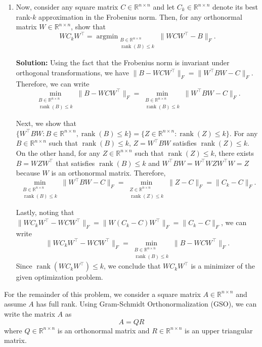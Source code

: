 \documentclass[10pt]{article}
\theoremstyle{definition}
\theoremstyle{plain}
\newcommand{\RR}{\mathbb{R}}
\DeclareMathOperator{\rank}{rank}
\DeclareMathOperator*{\argmin}{argmin}
\begin{document}
\begin{enumerate}[label=(\alph*)]
    \item Now, consider any square matrix $C \in \RR^{n \times n}$ and let $C_k \in \RR^{n \times n}$ denote its best rank-$k$ approximation in the Frobenius norm. Then, for any orthonormal matrix $W \in \RR^{n \times n}$, show that
    \[
        W C_k W^\top = \argmin_{\substack{B \in \RR^{n \times n} \\ \rank(B) \le k}} \|WCW^\top - B\|_F.
    \]

    \textbf{Solution:} Using the fact that the Frobenius norm is invariant under orthogonal transformations, we have $\|B - WCW^\top\|_F = \|W^\top BW - C\|_F$. Therefore, we can write
    \[
        \min_{\substack{B \in \RR^{n \times n} \\ \rank(B) \le k}} \|B - WCW^\top\|_F = \min_{\substack{B \in \RR^{n \times n} \\ \rank(B) \le k}} \|W^\top BW - C\|_F.
    \]

    Next, we show that $\{W^\top BW : B \in \RR^{n \times n}, \rank(B) \le k\} = \{Z \in \RR^{n \times n} : \rank(Z) \le k\}$. For any $B \in \RR^{n \times n}$ such that $\rank(B) \le k$, $Z = W^\top BW$ satisfies $\rank(Z) \le k$. On the other hand, for any $Z \in \RR^{n \times n}$ such that $\rank(Z) \le k$, there exists $B = WZW^\top$ that satisfies $\rank(B) \le k$ and $W^\top BW = W^\top WZW^\top W = Z$ because $W$ is an orthonormal matrix. Therefore,
    \[
        \min_{\substack{B \in \RR^{n \times n} \\ \rank(B) \le k}} \|W^\top BW - C\|_F = \min_{\substack{Z \in \RR^{n \times n} \\ \rank(Z) \le k}} \|Z - C\|_F = \|C_k - C\|_F.
    \]

    Lastly, noting that $\|WC_kW^\top - WCW^\top\|_F = \|W(C_k - C)W^\top\|_F = \|C_k - C\|_F$, we can write
    \[
        \|WC_kW^\top - WCW^\top\|_F = \min_{\substack{B \in \RR^{n \times n} \\ \rank(B) \le k}} \|B - WCW^\top\|_F.
    \]
    Since $\rank(WC_kW^\top) \le k$, we conclude that $WC_kW^\top$ is a minimizer of the given optimization problem.
\end{enumerate}

For the remainder of this problem, we consider a square matrix $A \in \RR^{n \times n}$ and assume $A$ has full rank. Using Gram-Schmidt Orthonormalization (GSO), we can write the matrix $A$ as
\begin{equation}
    A = QR
\end{equation}
where $Q \in \RR^{n \times n}$ is an orthonormal matrix and $R \in \RR^{n \times n}$ is an upper triangular matrix.
\end{document}
